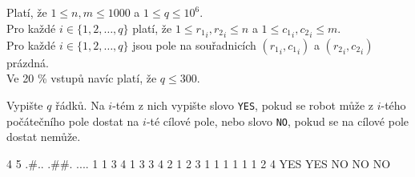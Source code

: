\bigskip
\noindent
Platí, že $1 \leq n,m \leq 1000$ a $1 \leq q \leq 10^6$.\\
Pro každé $i \in \{ 1, 2, \ldots, q \}$ platí, že $1 \leq {r_1}_i, {r_2}_i \leq n$ a $1 \leq {c_1}_i, {c_2}_i \leq m$.\\
Pro každé $i \in \{ 1, 2, \ldots, q \}$ jsou pole na souřadnicích $({r_1}_i, {c_1}_i)$ a $({r_2}_i, {c_2}_i)$ prázdná.\\
Ve 20 \% vstupů navíc platí, že $q \leq 300$.


Vypište $q$ řádků. Na $i$-tém z nich vypište slovo \texttt{YES}, pokud se robot může z $i$-tého počátečního pole dostat na $i$-té cílové pole, nebo slovo \texttt{NO}, pokud se na cílové pole dostat nemůže.


 4 5
.#..
.##.
....
1 1 3 4
1 3 3 4
2 1 2 3
1 1 1 1
1 1 2 4
\sampleOUT
YES
YES
NO
NO
NO
\sampleEND



